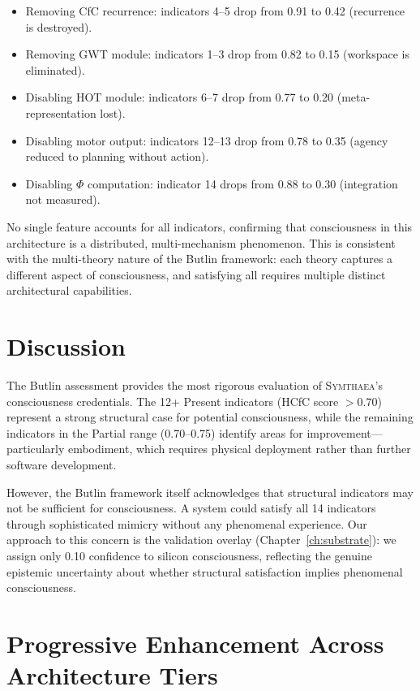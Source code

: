 \documentclass[12pt]{book}
\newcommand{\symthaea}{\textsc{Symthaea}}
\begin{document}
\begin{itemize}
  \item Removing CfC recurrence: indicators 4--5 drop from 0.91 to 0.42 (recurrence is destroyed).
  \item Removing GWT module: indicators 1--3 drop from 0.82 to 0.15 (workspace is eliminated).
  \item Disabling HOT module: indicators 6--7 drop from 0.77 to 0.20 (meta-representation lost).
  \item Disabling motor output: indicators 12--13 drop from 0.78 to 0.35 (agency reduced to planning without action).
  \item Disabling $\Phi$ computation: indicator 14 drops from 0.88 to 0.30 (integration not measured).
\end{itemize}

No single feature accounts for all indicators, confirming that consciousness in this architecture is a distributed, multi-mechanism phenomenon. This is consistent with the multi-theory nature of the Butlin framework: each theory captures a different aspect of consciousness, and satisfying all requires multiple distinct architectural capabilities.

\section{Discussion}

The Butlin assessment provides the most rigorous evaluation of \symthaea{}'s consciousness credentials. The 12+ Present indicators (HCfC score $> 0.70$) represent a strong structural case for potential consciousness, while the remaining indicators in the Partial range (0.70--0.75) identify areas for improvement---particularly embodiment, which requires physical deployment rather than further software development.

However, the Butlin framework itself acknowledges that structural indicators may not be sufficient for consciousness. A system could satisfy all 14 indicators through sophisticated mimicry without any phenomenal experience. Our approach to this concern is the validation overlay (Chapter~\ref{ch:substrate}): we assign only 0.10 confidence to silicon consciousness, reflecting the genuine epistemic uncertainty about whether structural satisfaction implies phenomenal consciousness.

\section{Progressive Enhancement Across Architecture Tiers}
\end{document}
